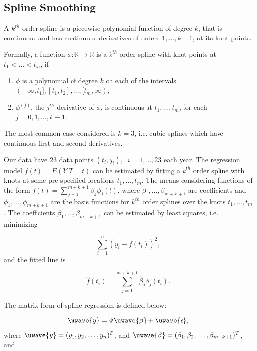 \documentclass{article}
\begin{document}
\subsection{Spline Smoothing}\label{Sec:SplineSmoothing}

A $k^{th}$ order spline is a piecewise polynomial function of degree $k$, that is continuous and has continuous derivatives of orders $1,\dots,k-1$, at its knot points.

Formally, a function $\phi:\mathbb{R}\rightarrow\mathbb{R}$ is a $k^{th}$ order spline with knot points at $t_1<\dots<t_m$, if

\begin{enumerate}
\item $\phi$ is a polynomial of degree $k$ on each of the intervals $(-\infty,t_1],[t_1,t_2],\dots,[t_m,\infty)$,
\item $\phi^{(j)}$, the $j^{th}$ derivative of $\phi$, is continuous at $t_1,\dots,t_m$, for each $j=0,1,\dots,k-1$.
\end{enumerate}

The most common case considered is $k=3$, i.e. cubic splines which have continuous first and second derivatives. 

Our data have 23 data points $(t_i,y_i),\;\;i=1,\dots,23$ each year. The regression model $f(t) = E(Y|T=t)$ can be estimated by fitting a $k^{th}$ order spline with knots at some pre-specified locations $t_1,\dots,t_m$. The means considering functions of the form $f(t)=\sum_{j=1}^{m+k+1}\beta_j\phi_j(t)$, where $\beta_1,\dots,\beta_{m+k+1}$ are coefficients and $\phi_1,\dots,\phi_{m+k+1}$ are the basis functions for $k^{th}$ order splines over the knots $t_1,\dots,t_m$. The coefficients $\beta_1,\dots,\beta_{m+k+1}$ can be estimated by least squares, i.e. minimizing

\begin{equation}
\sum_{i=1}^{n}\left(y_i-f(t_i)\right)^2,
\end{equation}
and the fitted line is 

\begin{equation}
\widehat{f}(t_i) = \sum_{j=1}^{m+k+1}\widehat{\beta}_j\phi_j(t_i).
\end{equation}


The matrix form of spline regression is defined below:

\begin{equation}
\uwave{y} = \Phi\uwave{\beta}+\uwave{\epsilon},
\end{equation}
where $\uwave{y} = (y_1,y_2,\dots,y_n)^{T}$, and $\uwave{\beta} = (\beta_1,\beta_2,\dots,\beta_{m+k+1})^{T}$, and
\end{document}
